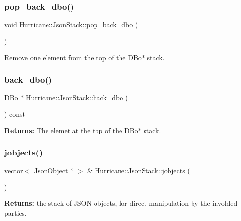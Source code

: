 \subsubsection{\texorpdfstring{pop\+\_\+back\+\_\+dbo()}{pop\_back\_dbo()}}
{\footnotesize\ttfamily void Hurricane\+::\+Json\+Stack\+::pop\+\_\+back\+\_\+dbo (\begin{DoxyParamCaption}{ }\end{DoxyParamCaption})\hspace{0.3cm}{\ttfamily [inline]}}

Remove one element from the top of the D\+Bo$\ast$ stack. \mbox{\label{classHurricane_1_1JsonStack_a95f403acdc0124c279866bd92ef8500a}} 
\subsubsection{\texorpdfstring{back\+\_\+dbo()}{back\_dbo()}}
{\footnotesize\ttfamily \hyperlink{classHurricane_1_1DBo}{D\+Bo} $\ast$ Hurricane\+::\+Json\+Stack\+::back\+\_\+dbo (\begin{DoxyParamCaption}{ }\end{DoxyParamCaption}) const\hspace{0.3cm}{\ttfamily [inline]}}

{\bfseries Returns\+:} The elemet at the top of the D\+Bo$\ast$ stack. \mbox{\label{classHurricane_1_1JsonStack_a974ee9daf5dbf861ed50cae0a51a5cbb}} 
\subsubsection{\texorpdfstring{jobjects()}{jobjects()}}
{\footnotesize\ttfamily vector$<$ \hyperlink{classHurricane_1_1JsonObject}{Json\+Object} $\ast$ $>$ \& Hurricane\+::\+Json\+Stack\+::jobjects (\begin{DoxyParamCaption}{ }\end{DoxyParamCaption})\hspace{0.3cm}{\ttfamily [inline]}}

{\bfseries Returns\+:} the stack of J\+S\+ON objects, for direct manipulation by the involded parties. 


